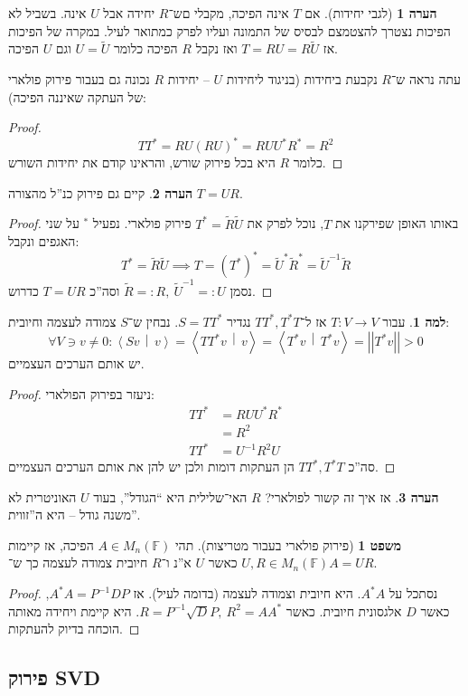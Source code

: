 \documentclass[a4paper]{article}
\newcommand\ra    {\rangle}
\newcommand\la    {\langle}
\newcommand\F         {\mathbb{F}}
\newcommand\co        {\colon}
\newcommand\norm[1]   {\left \vert \left \vert #1 \right \vert \right \vert}
\newcommand\mut [2]   {\left \la #1 \,\middle|\, #2 \right \ra}
\newcommand\tl    {\tilde}
\newcommand\op    {^{-1}}
\theoremstyle{definition}
\newtheorem{Theorem}{\color{myblue}משפט}
\newtheorem{Lemma}{\color{myyellow}למה}
\newtheorem{Remark}{\color{mycyan}הערה}
\newcommand\rmark [1] {\begin{Remark}#1\end{Remark}}
\newcommand\lem   [1] {\begin{Lemma}#1\end{Lemma}}
\begin{document}
	\begin{Remark}[לגבי יחידות]
		אם $T$ אינה הפיכה, מקבלי םש־$R$ יחידה אבל $U$ אינה. בשביל לא הפיכות נצטרך להצטמצם לבסיס של התמונה ועליו לפרק כמתואר לעיל. במקרה של הפיכות אז $T = RU = R \tl U$ ואז נקבל $R$ הפיכה כלומר $U = \tl U$ וגם $U$ הפיכה. 
	\end{Remark}
	
	עתה נראה ש־$R$ נקבעת ביחידות (בניגוד ליחידות $U$ – יחידות $R$ נכונה גם בעבור פירוק פולארי של העתקה שאיננה הפיכה): 
	\begin{proof}
		\[ TT^* = RU(RU)^* = RUU^*R^* = R^2 \]
		כלומר $R$ היא בכל פירוק שורש, והראינו קודם את יחידות השורש. 
	\end{proof}
	\rmark{קיים גם פירוק כנ''ל מהצורה $T = UR$. }
	\begin{proof}
		באותו האופן שפירקנו את $T$, נוכל לפרק את $T^* = \tl R \tl U$ פירוק פולארי. נפעיל $^*$ על שני האגפים ונקבל: 
		\[ T^* =\tl R \tl U \implies T = (T^*)^* = \tl U^*\tl R^* = \tl U\op \tl R \]
		נסמן $\tl R =: R, \ \tl U\op =: U$ וסה''כ $T = UR$ כדרוש. 
	\end{proof}
	\lem{עבור $T \co V \to V$ אז ל־$TT^*, T^*T$
		נגדיר $S = TT^*$. נבחין ש־$S$ צמודה לעצמה וחיובית: 
		\[ \forall V \ni v \neq 0 \co \mut{Sv}{v} = \mut{TT^* v}{v} = \mut{T^* v}{T^*v} = \norm{T^*v} > 0 \] יש אותם הערכים העצמיים. }
	\begin{proof}ניעזר בפירוק הפולארי: 
		\begin{align*}
			TT^* &= RUU^*R^* \\
			&= R^2 \\
			TT^* &= U\op R^2U
		\end{align*}
		סה''כ $TT^*, T^*T$ הן העתקות דומות ולכן יש להן את אותם הערכים העצמיים. 
	\end{proof}
	
	\rmark{אז איך זה קשור לפולארי? $R$ האי־שלילית היא ``הגודל'', בעוד $U$ האוניטרית לא משנה גודל – היא ה''זווית''. }
	
	
	\begin{Theorem}[פירוק פולארי בעבור מטריצות]
		תהי $A \in M_n(\F)$ הפיכה, אז קיימות $U, R \in M_n(\F)$ כאשר $U$ א''נ ו־$R$ חיובית צמודה לעצמה כך ש־$A = UR$. 
	\end{Theorem}
	\begin{proof}
		נסתכל על $A^*A$. היא חיובית וצמודה לעצמה (בדומה לעיל). אז $A^*A = P\op D P$, כאשר $D$ אלגסונית חיובית. כאשר $R = P\op \sqrt D P, \ R^2 = AA^*$. היא קיימת ויחידה מאותה הוכחה בדיוק להעתקות. 
	\end{proof}
	
	\subsection{פירוק SVD}
\end{document}
